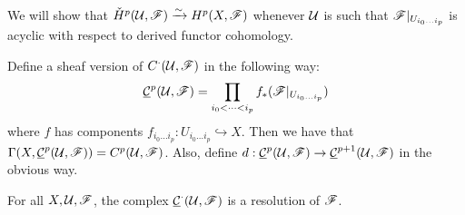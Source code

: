  \setcounter{lecture}{11}

We will show that $\check H^p(\mathcal{U},\mathscr{F})\xrightarrow{\sim} H^p(X,\mathscr{F})$
whenever $\mathcal{U}$ is such that $\mathscr{F}|_{U_{i_0\dots i_p}}$ is acyclic
with respect to derived functor cohomology.

Define a sheaf version of $C^{\cdot}(\mathcal{U},\mathscr{F})$ in the following way:
\[
    \underline{\mathcal{C}}^p(\mathcal{U},\mathscr{F}) = \prod_{i_0<\cdots <i_p} f_*(\mathscr{F}|_{U_{i_0\dots
    i_p}})
\]
where $f$ has components $f_{i_0\dots i_p}:U_{i_0\dots
i_p}\hookrightarrow X$.  Then we have that
$\Gamma(X,\underline{\mathcal{C}}^p(\mathcal{U},\mathscr{F}))=C^p(\mathcal{U},\mathscr{F})$.  Also, define
$d:\underline{\mathcal{C}}^p(\mathcal{U},\mathscr{F})\to \underline{\mathcal{C}}^{p+1}(\mathcal{U},\mathscr{F})$ in the obvious way.

\begin{lemma}\label{L:lec11cechexact}
For all $X,\mathcal{U},\mathscr{F}$, the complex $\underline{\mathcal{C}}^{\cdot}(\mathcal{U},\mathscr{F})$ is a resolution
of $\mathscr{F}$.
\end{lemma}
